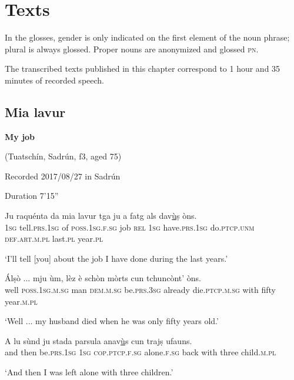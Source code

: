 \chapter{Texts}
In the glosses, gender is only indicated on the first element of the noun phrase; plural is always glossed. Proper nouns are anonymized and glossed \textsc{pn}.

The transcribed texts published in this chapter correspond to 1 hour and 35 minutes of recorded speech.


\section{Mia lavur}

\noindent
\textbf{My job}

\noindent
(Tuatschín, Sadrún, f3, aged 75)

\noindent
Recorded  2017/08/27 in Sadrún

\noindent
Duration 7'15''
\bigskip

\begin{linenumbers}
\gll   Ju raquénta da mia lavur tga ju a fatg als dav\underline{ù}ṣ òns. \\
 \textsc{1sg} tell.\textsc{prs.1sg} of \textsc{poss.1sg.f.sg} job \textsc{rel} \textsc{1sg}  have.\textsc{prs.1sg} do.\textsc{ptcp.unm} \textsc{def.art.m.pl} last.\textsc{pl} year.\textsc{pl}\\
\end{linenumbers}
\medskip
\glt `I’ll tell [you] about the job I have done during the last years.'
\medskip

\begin{linenumbers}
\gll  Álṣò ... mju ùm, lèz è schòn mòrts cun tchuncònt’ òns.  \\
well {} \textsc{poss.1sg.m.sg} man \textsc{dem.m.sg} be.\textsc{prs.3sg} already die.\textsc{ptcp.m.sg}  with fifty year.\textsc{m.pl} \\
\end{linenumbers}
\medskip
\glt `Well ... my husband died when he was only fifty years old.'
\medskip

\begin{linenumbers}
\gll A lu sùnd ju stada parsula anav\underline{ù}s cun trajṣ ufauns.   \\
and then be.\textsc{prs.1sg} \textsc{1sg} \textsc{cop.ptcp.f.sg} alone.\textsc{f.sg} back with three child.\textsc{m.pl}  \\
\end{linenumbers}
\medskip
\glt `And then I was left alone with three children.'
\medskip

